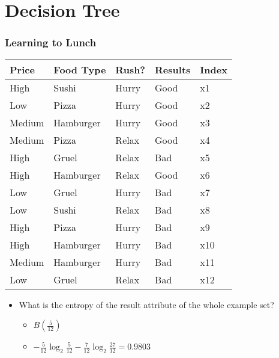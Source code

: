 \documentclass[compress, 9pt]{beamer}
\begin{document}
\section{Decision Tree}
\label{sec-2}
\begin{frame}
\frametitle{Learning to Lunch}
\label{sec-2-1}


\begin{center}
\begin{tabular}{lllll}
\hline
 Price   &  Food Type  &  Rush?  &  Results  &  Index  \\
\hline
 High    &  Sushi      &  Hurry  &  Good     &  x1     \\
 Low     &  Pizza      &  Hurry  &  Good     &  x2     \\
 Medium  &  Hamburger  &  Hurry  &  Good     &  x3     \\
 Medium  &  Pizza      &  Relax  &  Good     &  x4     \\
 High    &  Gruel      &  Relax  &  Bad      &  x5     \\
 High    &  Hamburger  &  Relax  &  Good     &  x6     \\
 Low     &  Gruel      &  Hurry  &  Bad      &  x7     \\
 Low     &  Sushi      &  Relax  &  Bad      &  x8     \\
 High    &  Pizza      &  Hurry  &  Bad      &  x9     \\
 High    &  Hamburger  &  Hurry  &  Bad      &  x10    \\
 Medium  &  Hamburger  &  Hurry  &  Bad      &  x11    \\
 Low     &  Gruel      &  Relax  &  Bad      &  x12    \\
\hline
\end{tabular}
\end{center}
\begin{itemize}

\item <2-> What is the entropy of the result attribute of the whole example set?
\label{sec-2-1-1}%
\begin{itemize}

\item <3-> $B(\frac{5}{12})$
\label{sec-2-1-1-1}%

\item <4-> $-\frac{5}{12}\log_2\frac{5}{12} - \frac{7}{12}\log_2\frac{27}{12} = 0.9803$
\label{sec-2-1-1-2}%
\end{itemize} %
\end{itemize} %
\end{frame}
\end{document}
